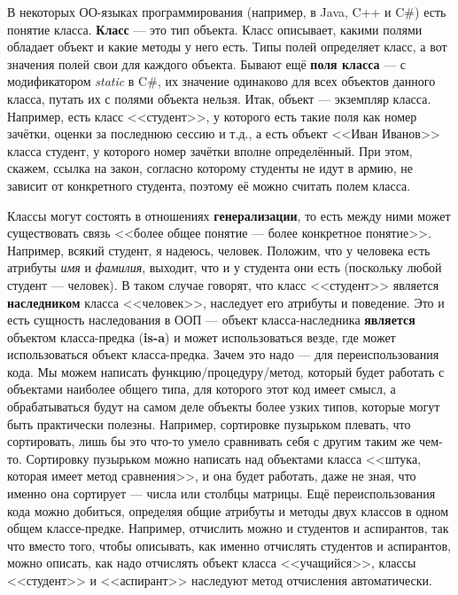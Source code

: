 \documentclass[a5paper]{article}
\begin{document}
В некоторых ОО-языках программирования (например, в Java, C++ и C\#) есть понятие класса. \textbf{Класс} --- это тип объекта. Класс описывает, какими полями обладает объект и какие методы у него есть. Типы полей определяет класс, а вот значения полей свои для каждого объекта. Бывают ещё \textbf{поля класса} --- с модификатором \textit{static} в C\#, их значение одинаково для всех объектов данного класса, путать их с полями объекта нельзя. Итак, объект --- экземпляр класса. Например, есть класс <<студент>>, у которого есть такие поля как номер зачётки, оценки за последнюю сессию и т.д., а есть объект <<Иван Иванов>> класса студент, у которого номер зачётки вполне определённый. При этом, скажем, ссылка на закон, согласно которому студенты не идут в армию, не зависит от конкретного студента, поэтому её можно считать полем класса.

Классы могут состоять в отношениях \textbf{генерализации}, то есть между ними может существовать связь <<более общее понятие --- более конкретное понятие>>. Например, всякий студент, я надеюсь, человек. Положим, что у человека есть атрибуты \textit{имя} и \textit{фамилия}, выходит, что и у студента они есть (поскольку любой студент --- человек). В таком случае говорят, что класс <<студент>> является \textbf{наследником} класса <<человек>>, наследует его атрибуты и поведение. Это и есть сущность наследования в ООП --- объект класса-наследника \textbf{является} объектом класса-предка (\textbf{is-a}) и может использоваться везде, где может использоваться объект класса-предка. Зачем это надо --- для переиспользования кода. Мы можем написать функцию/процедуру/метод, который будет работать с объектами наиболее общего типа, для которого этот код имеет смысл, а обрабатываться будут на самом деле объекты более узких типов, которые могут быть практически полезны. Например, сортировке пузырьком плевать, что сортировать, лишь бы это что-то умело сравнивать себя с другим таким же чем-то. Сортировку пузырьком можно написать над объектами класса <<штука, которая имеет метод сравнения>>, и она будет работать, даже не зная, что именно она сортирует --- числа или столбцы матрицы. Ещё переиспользования кода можно добиться, определяя общие атрибуты и методы двух классов в одном общем классе-предке. Например, отчислить можно и студентов и аспирантов, так что вместо того, чтобы описывать, как именно отчислять студентов и аспирантов, можно описать, как надо отчислять объект класса <<учащийся>>, классы <<студент>> и <<аспирант>> наследуют метод отчисления автоматически. 
\end{document}
